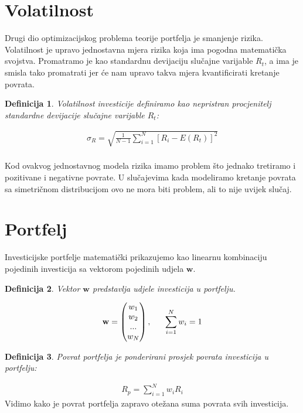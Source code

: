 \documentclass[zavrsnirad]{fer}
\newtheorem{definition}{Definicija}
\begin{document}
\section{Volatilnost}
Drugi dio optimizacijskog problema teorije portfelja je smanjenje rizika.
Volatilnost je upravo jednostavna mjera rizika koja ima pogodna matematička svojstva.
Promatramo je kao standardnu devijaciju slučajne varijable $R_t$, a ima je smisla tako promatrati
jer će nam upravo takva mjera kvantificirati kretanje povrata.
\begin{definition}
  Volatilnost investicije definiramo kao nepristran procjenitelj
    standardne devijacije slučajne varijable $R_t$:
\end{definition}
\begin{align*}
  \sigma_R = \sqrt{\frac{1}{N - 1} \sum_{i = 1}^{N} \left[R_i - E(R_t)\right]^2}
\end{align*}
\\
Kod ovakvog jednostavnog modela rizika imamo problem što jednako tretiramo i pozitivane i negativne povrate.
U slučajevima kada modeliramo kretanje povrata sa simetričnom distribucijom ovo 
ne mora biti problem, ali to nije uvijek slučaj.

\section{Portfelj}
Investicijske portfelje matematički prikazujemo kao linearnu kombinaciju
pojedinih investicija sa vektorom pojedinih udjela $\mathbf{w}$.
\begin{definition}
  Vektor $\mathbf{w}$ predstavlja udjele investicija u portfelju.
\end{definition}
\begin{align*}
  \mathbf{w} = \begin{pmatrix} w_1 \\ w_2 \\ ... \\ w_N \end{pmatrix},
  \indent \sum_{i = 1}^{N} w_i = 1
\end{align*}

\begin{definition}
  Povrat portfelja je ponderirani prosjek povrata investicija u portfelju:
\end{definition}
\begin{align*}
  R_p = \sum_{i = 1}^{N} w_i R_i
\end{align*}
\indent Vidimo kako je povrat portfelja zapravo otežana suma povrata svih investicija.
\end{document}
